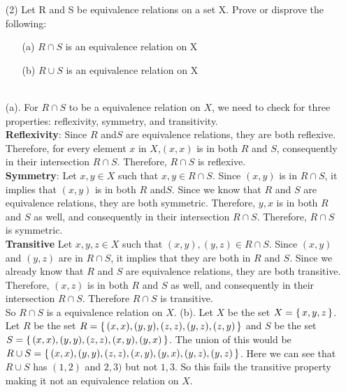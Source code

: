 \documentclass[answers,12pt]{exam}
\newcommand{\br}{\hfill \break}
\newcommand{\bs}{\begin{solution}}
\newcommand{\es}{\end{solution}}
\begin{document}
\begin{enumerate}
    \item [(2)] Let R and S be equivalence relations on a set X. Prove or disprove the following: \begin{enumerate}
        \item [(a)] \(R \cap S\) is an equivalence relation on X
        \item [(b)] \(R \cup S\) is an equivalence relation on X
    \end{enumerate}
    \bs
    \\
    (a). For \(R \cap S\) to be a equivalence relation on \(X\), we need to check for three properties: reflexivity, symmetry, and transitivity.\\
    \textbf{Reflexivity}: Since \(R\) and\(S\) are equivalence relations, they are both reflexive. Therefore, for every element \(x\) in \(X\),\((x,x)\) is in both \(R\) and \(S\), consequently in their intersection \(R \cap S\). Therefore, \(R \cap S\) is reflexive.\\
    \textbf{Symmetry}: Let \(x,y \in X\) such that \(x,y \in R \cap S\). Since \((x,y)\) is in \(R \cap S\), it implies that \((x,y)\) is in both \(R\) and\(S\). Since we know that \(R\) and \(S\) are equivalence relations, they are both symmetric. Therefore, \(y,x\) is in both \(R\) and \(S\) as well, and consequently in their intersection \(R \cap S\). Therefore, \(R \cap S\) is symmetric.\\
    \textbf{Transitive} Let \(x,y,z \in X\) such that \((x,y),(y,z) \in R \cap S\). Since \((x,y)\) and \((y,z)\) are in \(R \cap S\), it implies that they are both in \(R\) and \(S\). Since we already know that \(R\) and \(S\) are equivalence relations, they are both transitive. Therefore, \((x,z)\) is in both \(R\) and \(S\) as well, and consequently in their intersection \(R \cap S\). Therefore \(R \cap S\) is transitive.\\
    So \(R \cap S\) is a equivalence relation on \(X\).
    (b). Let \(X\) be the set \(X = \set{x,y,z}\). Let \(R\) be the set \(R = \set{(x,x),(y,y),(z,z),(y,z),(z,y)}\) and \(S\) be the set \(S = \set{(x,x),(y,y),(z,z),(x,y),(y,x)}\). The union of this would be \(R \cup S = \set{(x,x),(y,y),(z,z),(x,y),(y,x),(y,z),(y,z)}\). Here we can see that \(R \cup S\) has \((1,2)\) and \(2,3)\) but not \(1,3\). So this fails the transitive property making it not an equivalence relation on \(X\).
    \es
\end{enumerate}

\br
\end{document}
